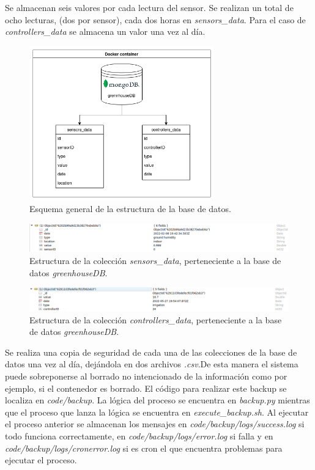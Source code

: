 \documentclass[a4paper, 12pt, oneside]{book}
\begin{document}
Se almacenan seis valores por cada lectura del sensor. Se realizan un total de ocho lecturas, (dos por sensor), cada dos horas en \textit{sensors\_data}. Para el caso de \textit{controllers\_data} se almacena un valor una vez al día.
\begin{figure}[H]
	\centering
    \includegraphics[width=8cm, keepaspectratio]{img/estructura_db}
    \caption{Esquema general de la estructura de la base de datos.}
    \label{figura:estructura_bd}
\end{figure}
\begin{figure}[H]
	\centering
    \includegraphics[width=15cm, keepaspectratio]{img/sensors_data_collection}
    \caption{Estructura de la colección \textit{sensors\_data}, perteneciente a la base de datos \textit{greenhouseDB}.}
    \label{figura:sensors data collection}
\end{figure}
\begin{figure}[H]
	\centering
    \includegraphics[width=15cm, keepaspectratio]{img/controllers_data_collection}
    \caption{Estructura de la colección \textit{controllers\_data}, perteneciente a la base de datos \textit{greenhouseDB}.}
    \label{figura:controllers data collection}
\end{figure}


Se realiza una copia de seguridad de cada una de las colecciones de la base de datos una vez al día, dejándola en dos archivos \textit{.csv}.De esta manera el sistema puede sobreponerse al borrado no intencionado de la información como por ejemplo,  si el contenedor es borrado.
El código para realizar este backup se localiza en \textit{code/backup}. La lógica del proceso se encuentra en \textit{backup.py} mientras que el proceso que lanza la lógica se encuentra en \textit{execute\_backup.sh}. 
Al ejecutar el proceso anterior se almacenan los mensajes en \textit{code/backup/logs/success.log} si todo funciona correctamente, en \textit{code/backup/logs/error.log} si falla y en \textit{code/backup/logs/cronerror.log} si es cron el que encuentra problemas para ejecutar el proceso.
\end{document}
